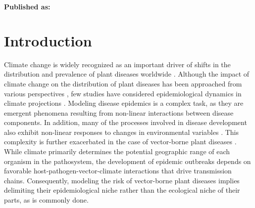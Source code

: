\vspace{3cm}





\textbf{Published as:}

\vspace{0.5cm}


\newpage
\section{Introduction}

Climate change is widely recognized as an important driver of shifts in the
distribution and prevalence of plant diseases worldwide
\cite{Harvell2002, Delgado-Baquerizo2020,  Rocklov2020, Dudney2021,
    Chaloner2021, Singh2023}. Although the impact of climate change on the
distribution of plant diseases has been approached from various perspectives
\cite{bergot2004simulation,pangga2011pathogen}, few studies have considered
epidemiological dynamics in climate projections
\cite{bebber2019climate,Juroszek2015}. Modeling disease epidemics is a complex
task, as they are emergent phenomena resulting from non-linear interactions
between disease components. In addition, many of the processes involved in
disease development also exhibit non-linear responses to changes in
environmental variables \cite{Scherm1994,garrett2011complexity}. This
complexity is further exacerbated in the case of vector-borne plant diseases
\cite{Jeger2019}. While climate primarily determines the potential
geographic range of each organism in the pathosystem, the development of
epidemic outbreaks depends on favorable host-pathogen-vector-climate
interactions that drive transmission chains. Consequently, modeling the risk of
vector-borne plant diseases implies delimiting their epidemiological niche
rather than the ecological niche of their parts, as is commonly done.

